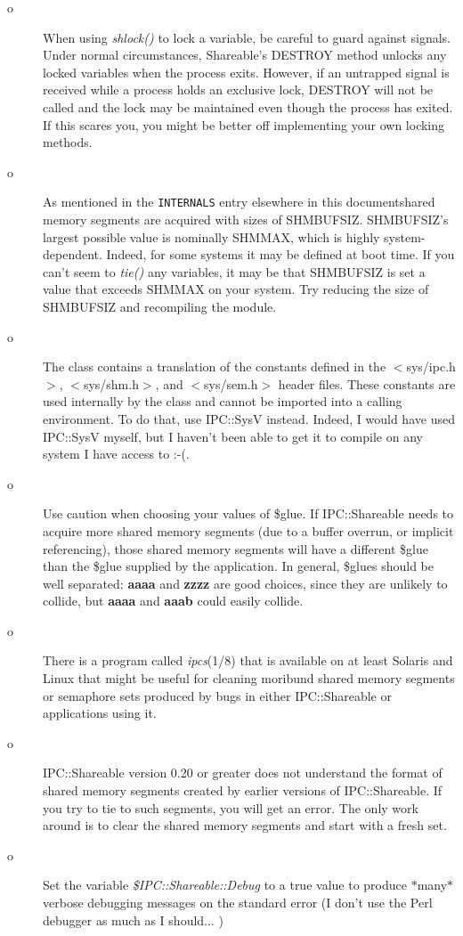 \begin{description}

\item[o]
When using {\em shlock()\/} to lock a variable, be careful to guard against
signals.  Under normal circumstances, Shareable's DESTROY method
unlocks any locked variables when the process exits.  However, if an
untrapped signal is received while a process holds an exclusive lock,
DESTROY will not be called and the lock may be maintained even though
the process has exited.  If this scares you, you might be better off
implementing your own locking methods.

\item[o]
As mentioned in the {\tt INTERNALS} entry elsewhere in this documentshared memory segments are acquired
with sizes of SHM\underscore{}BUFSIZ.  SHM\underscore{}BUFSIZ's largest possible value is
nominally SHMMAX, which is highly system-dependent.  Indeed, for some
systems it may be defined at boot time.  If you can't seem to {\em tie()\/}
any variables, it may be that SHM\underscore{}BUFSIZ is set a value that exceeds
SHMMAX on your system.  Try reducing the size of SHM\underscore{}BUFSIZ and
recompiling the module.

\item[o]
The class contains a translation of the constants defined in the
$<$sys/ipc.h$>$, $<$sys/shm.h$>$, and $<$sys/sem.h$>$ header files.  These
constants are used internally by the class and cannot be imported into
a calling environment.  To do that, use IPC::SysV instead.  Indeed, I
would have used IPC::SysV myself, but I haven't been able to get it to
compile on any system I have access to :-(.

\item[o]
Use caution when choosing your values of \$glue.  If IPC::Shareable
needs to acquire more shared memory segments (due to a buffer overrun,
or implicit referencing), those shared memory segments will have a
different \$glue than the \$glue supplied by the application.  In
general, \$glues should be well separated: {\bf aaaa} and {\bf zzzz} are good
choices, since they are unlikely to collide, but {\bf aaaa} and {\bf aaab}
could easily collide.

\item[o]
There is a program called {\em ipcs\/}(1/8) that is available on at least
Solaris and Linux that might be useful for cleaning moribund shared
memory segments or semaphore sets produced by bugs in either
IPC::Shareable or applications using it.

\item[o]
IPC::Shareable version 0.20 or greater does not understand the format
of shared memory segments created by earlier versions of
IPC::Shareable.  If you try to tie to such segments, you will get an
error.  The only work around is to clear the shared memory segments
and start with a fresh set.

\item[o]
Set the variable {\em \$IPC::Shareable::Debug\/} to a true value to produce
$\ast$many$\ast$ verbose debugging messages on the standard error (I don't use
the Perl debugger as much as I should... )

\end{description}

